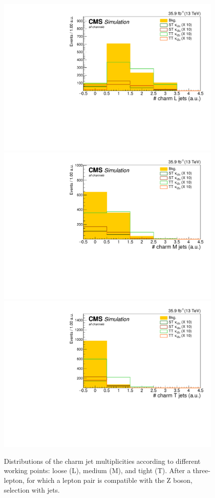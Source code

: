 \begin{figure}[htbp]
	\centering
	\includegraphics[width=0.3\linewidth]{7_Conclusion/Figures/charmtagging/3lepcontrol_dilep_nJetsCharmL_all_Stack}
	\includegraphics[width=0.3\linewidth]{7_Conclusion/Figures/charmtagging/3lepcontrol_dilep_nJetsCharmM_all_Stack}
	\includegraphics[width=0.3\linewidth]{7_Conclusion/Figures/charmtagging/3lepcontrol_dilep_nJetsCharmT_all_Stack}
	\caption{Distributions of the charm jet multiplicities according to different working points: loose (L), medium (M), and  tight (T). After a three-lepton, for which a lepton pair is compatible with the Z boson, selection with jets.}
	\label{fig:charm}
\end{figure}


